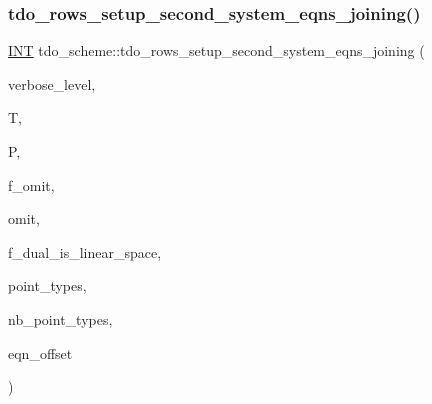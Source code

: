 \subsubsection{\texorpdfstring{tdo\+\_\+rows\+\_\+setup\+\_\+second\+\_\+system\+\_\+eqns\+\_\+joining()}{tdo\_rows\_setup\_second\_system\_eqns\_joining()}}
{\footnotesize\ttfamily \mbox{\hyperlink{galois_8h_a09fddde158a3a20bd2dcadb609de11dc}{I\+NT}} tdo\+\_\+scheme\+::tdo\+\_\+rows\+\_\+setup\+\_\+second\+\_\+system\+\_\+eqns\+\_\+joining (\begin{DoxyParamCaption}\item[{\mbox{\hyperlink{galois_8h_a09fddde158a3a20bd2dcadb609de11dc}{I\+NT}}}]{verbose\+\_\+level,  }\item[{\mbox{\hyperlink{classtdo__data}{tdo\+\_\+data}} \&}]{T,  }\item[{\mbox{\hyperlink{classpartitionstack}{partitionstack}} \&}]{P,  }\item[{\mbox{\hyperlink{galois_8h_a09fddde158a3a20bd2dcadb609de11dc}{I\+NT}}}]{f\+\_\+omit,  }\item[{\mbox{\hyperlink{galois_8h_a09fddde158a3a20bd2dcadb609de11dc}{I\+NT}}}]{omit,  }\item[{\mbox{\hyperlink{galois_8h_a09fddde158a3a20bd2dcadb609de11dc}{I\+NT}}}]{f\+\_\+dual\+\_\+is\+\_\+linear\+\_\+space,  }\item[{\mbox{\hyperlink{galois_8h_a09fddde158a3a20bd2dcadb609de11dc}{I\+NT}} $\ast$}]{point\+\_\+types,  }\item[{\mbox{\hyperlink{galois_8h_a09fddde158a3a20bd2dcadb609de11dc}{I\+NT}}}]{nb\+\_\+point\+\_\+types,  }\item[{\mbox{\hyperlink{galois_8h_a09fddde158a3a20bd2dcadb609de11dc}{I\+NT}}}]{eqn\+\_\+offset }\end{DoxyParamCaption})}

\mbox{\label{classtdo__scheme_af0d0dd149f3b51eb9ba5c7b2477f31f8}} 
